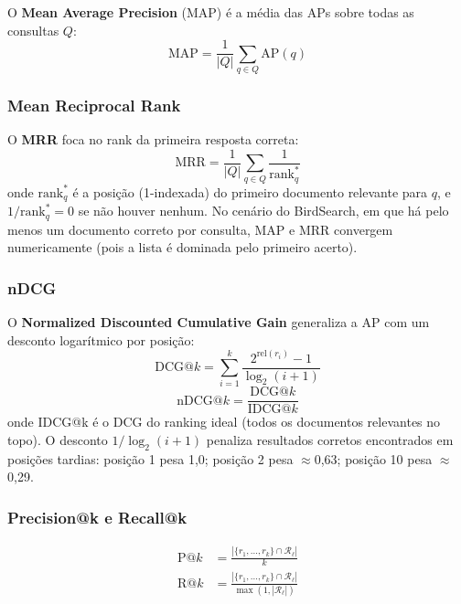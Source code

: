 \documentclass[12pt,a4paper]{article}
\begin{document}
O \textbf{Mean Average Precision} (MAP) é a média das APs sobre todas as
consultas $Q$:
\begin{equation}
  \text{MAP} = \frac{1}{|Q|}\sum_{q \in Q} \text{AP}(q)
  \label{eq:map}
\end{equation}

\subsubsection{Mean Reciprocal Rank}

O \textbf{MRR} foca no rank da primeira resposta correta:
\begin{equation}
  \text{MRR} = \frac{1}{|Q|}\sum_{q \in Q} \frac{1}{\text{rank}_q^*}
  \label{eq:mrr}
\end{equation}
onde $\text{rank}_q^*$ é a posição (1-indexada) do primeiro documento relevante
para $q$, e $1/\text{rank}_q^* = 0$ se não houver nenhum. No cenário do
BirdSearch, em que há pelo menos um documento correto por consulta, MAP e MRR
convergem numericamente (pois a lista é dominada pelo primeiro acerto).

\subsubsection{nDCG}

O \textbf{Normalized Discounted Cumulative Gain} generaliza a AP com um desconto
logarítmico por posição:
\begin{equation}
  \text{DCG}@k = \sum_{i=1}^{k}
  \frac{2^{\text{rel}(r_i)} - 1}{\log_2(i + 1)}
  \label{eq:dcg}
\end{equation}
\begin{equation}
  \text{nDCG}@k = \frac{\text{DCG}@k}{\text{IDCG}@k}
  \label{eq:ndcg}
\end{equation}
onde IDCG@k é o DCG do ranking ideal (todos os documentos relevantes no topo).
O desconto $1/\log_2(i+1)$ penaliza resultados corretos encontrados em posições
tardias: posição 1 pesa 1,0; posição 2 pesa $\approx$0,63; posição 10 pesa
$\approx$0,29.

\subsubsection{Precision@k e Recall@k}

\begin{align}
  \text{P@}k &= \frac{|\{r_1,\ldots,r_k\} \cap \mathcal{R}_\ell|}{k}
  \label{eq:patk}\\[4pt]
  \text{R@}k &= \frac{|\{r_1,\ldots,r_k\} \cap \mathcal{R}_\ell|}
                    {\max(1,|\mathcal{R}_\ell|)}
  \label{eq:ratk}
\end{align}
\end{document}
